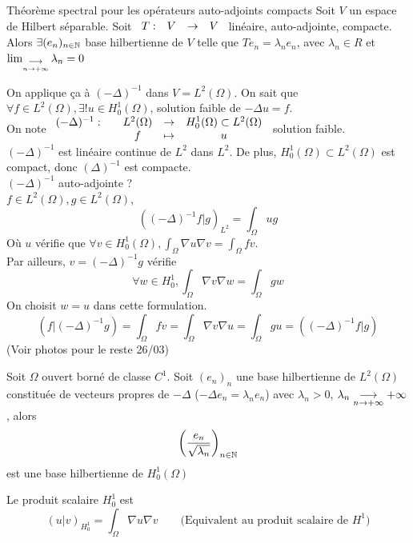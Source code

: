 \documentclass[]{report}
\begin{document}
    \begin{tm}{Théorème  spectral pour les opérateurs auto-adjoints compacts}{}
        Soit $V$ un espace de Hilbert séparable. Soit $\begin{array}{ccccc} T : & V & \to & V \end{array}$ linéaire, auto-adjointe, compacte.\\
        Alors $\exists(e_n)_{{n\in\mathbb{N}}}$ base hilbertienne de $V$ telle que $T e_n=\lambda_n e_n$, avec $\lambda_n\in R$ et $\lim_{\underset{n\to +\infty}{\longrightarrow}} \lambda_n=0$
    \end{tm}

    On applique ça à $(-\Delta)^{-1}$ dans $V=L^2(\Omega)$. On sait que $\forall f\in L^2(\Omega),\exists! u\in H_0^1(\Omega)$, solution faible de $-\Delta u=f$.\\
    On note $\begin{array}{ccccc} (-\Delta)^{-1} : & & L^2(\Omega) & \to & H_0^1(\Omega)\subset L^2(\Omega) \\ & & f & \mapsto & u \end{array}$ solution faible.\\
    $(-\Delta)^{-1}$ est linéaire continue de $L^2$ dans $L^2$. De plus, $H_0^1(\Omega)\subset L^2(\Omega)$ est compact, donc $(\Delta)^{-1}$ est compacte.\\
    $(-\Delta)^{-1}$ auto-adjointe ?\\
    $f\in L^2(\Omega),g\in L^2(\Omega)$,
    \[\left((-\Delta)^{-1} f | g\right)_{L^2}=\int_\Omega ug\]
    Où $u$ vérifie que $\forall v\in H_0^1(\Omega),\int_\Omega \nabla u\nabla v=\int_\Omega fv$.\\
    Par ailleurs, $v=(-\Delta)^{-1}g$ vérifie
    \[\forall w\in H_0^1,\int_\Omega \nabla v\nabla w=\int_\Omega g w\]
    On choisit $w=u$ dans cette formulation.
    \[\left(f|(-\Delta)^{-1} g\right)=\int_\Omega fv =\int_\Omega\nabla v\nabla u=\int_\Omega gu=\left((-\Delta)^{-1} f|g\right)\]
    (Voir photos pour le reste 26/03)

    \begin{prop}{}{}
        Soit $\Omega$ ouvert borné de classe $C^1$. Soit $(e_n)_n$ une base hilbertienne de $L^2(\Omega)$ constituée de vecteurs propres de $-\Delta$ ($-\Delta e_n=\lambda_n e_n$) avec $\lambda_n >0$, $\lambda_n \underset{n\to +\infty}{\longrightarrow} +\infty$, alors
        \[\left(\frac{e_n}{\sqrt{\lambda_n}}\right)_{n\in\mathbb{N}}\]
        est une base hilbertienne de $H_0^1(\Omega)$
    \end{prop}

    \begin{ra}{}{}
        Le produit scalaire $H_0^1$ est
        \[\left(u|v\right)_{H_0^1}=\int_\Omega \nabla u\nabla v\qquad \text{(Equivalent au produit scalaire de $H^1$)}\]
    \end{ra}
\end{document}
